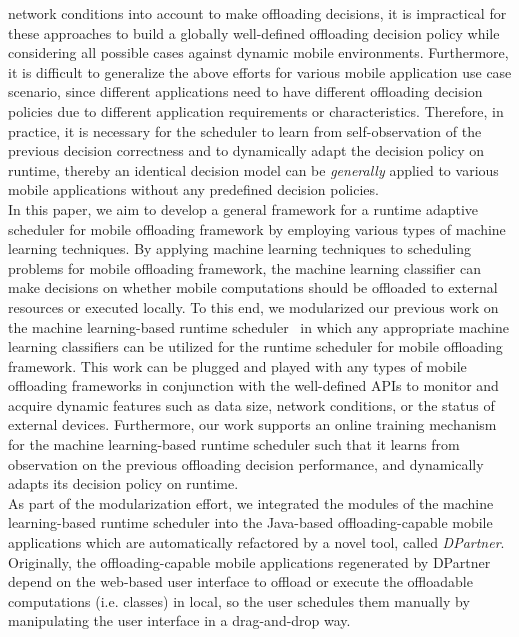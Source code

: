 \documentclass[10pt, conference, compsocconf]{IEEEtran}
\begin{document}
network conditions into account to make offloading decisions, it is
impractical for these approaches to build a globally well-defined
offloading decision policy while considering all possible cases against
dynamic mobile environments.
%
Furthermore, it is difficult to generalize the above efforts for various
mobile application use case scenario, since different applications need
to have different offloading decision policies due to different
application requirements or characteristics.
%
Therefore, in practice, it is necessary for the scheduler to learn
from self-observation of the previous decision correctness and to
dynamically adapt the decision policy on runtime, thereby an identical
decision model can be \textit{generally} applied to various mobile
applications without any predefined decision policies.\\
%
\indent In this paper, we aim to develop a general framework for a
runtime adaptive scheduler for mobile offloading framework by
employing various types of machine learning techniques.
%
By applying machine learning techniques to scheduling problems
for mobile offloading framework, the machine learning classifier can
make decisions on whether mobile computations should be offloaded to
external resources or executed locally.
%
To this end, we modularized our previous work on the machine
learning-based runtime scheduler~\cite{ml} in which any appropriate
machine learning classifiers can be utilized for the runtime scheduler
for mobile offloading framework.
%
This work can be plugged and played with any types of mobile offloading
frameworks in conjunction with the well-defined APIs to monitor and
acquire dynamic features such as data size, network conditions, or the
status of external devices. 
%
Furthermore, our work supports an online training mechanism for
the machine learning-based runtime scheduler such that it learns from
observation on the previous offloading decision performance, and
dynamically adapts its decision policy on runtime.\\
%
\indent As part of the modularization effort, we integrated the
modules of the machine learning-based runtime scheduler into the Java-based
offloading-capable mobile applications which are automatically
refactored by a novel tool, called \textit{DPartner}.
%
Originally, the offloading-capable mobile applications regenerated by
DPartner depend on the web-based user interface to offload or execute
the offloadable computations (i.e. classes) in local, so the user
schedules them manually by manipulating the user interface in a
drag-and-drop way.
\end{document}
